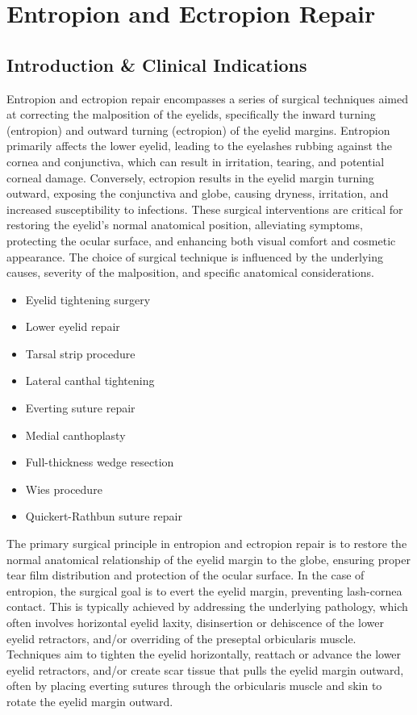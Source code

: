 \chapter{Entropion and Ectropion Repair}

\section*{Introduction \& Clinical Indications}
Entropion and ectropion repair encompasses a series of surgical techniques aimed at correcting the malposition of the eyelids, specifically the inward turning (entropion) and outward turning (ectropion) of the eyelid margins. Entropion primarily affects the lower eyelid, leading to the eyelashes rubbing against the cornea and conjunctiva, which can result in irritation, tearing, and potential corneal damage. Conversely, ectropion results in the eyelid margin turning outward, exposing the conjunctiva and globe, causing dryness, irritation, and increased susceptibility to infections. These surgical interventions are critical for restoring the eyelid's normal anatomical position, alleviating symptoms, protecting the ocular surface, and enhancing both visual comfort and cosmetic appearance. The choice of surgical technique is influenced by the underlying causes, severity of the malposition, and specific anatomical considerations.

\begin{itemize}
  \item Eyelid tightening surgery
  \item Lower eyelid repair
  \item Tarsal strip procedure
  \item Lateral canthal tightening
  \item Everting suture repair
  \item Medial canthoplasty
  \item Full-thickness wedge resection
  \item Wies procedure
  \item Quickert-Rathbun suture repair
\end{itemize}

The primary surgical principle in entropion and ectropion repair is to restore the normal anatomical relationship of the eyelid margin to the globe, ensuring proper tear film distribution and protection of the ocular surface. In the case of entropion, the surgical goal is to evert the eyelid margin, preventing lash-cornea contact. This is typically achieved by addressing the underlying pathology, which often involves horizontal eyelid laxity, disinsertion or dehiscence of the lower eyelid retractors, and/or overriding of the preseptal orbicularis muscle. Techniques aim to tighten the eyelid horizontally, reattach or advance the lower eyelid retractors, and/or create scar tissue that pulls the eyelid margin outward, often by placing everting sutures through the orbicularis muscle and skin to rotate the eyelid margin outward. 

